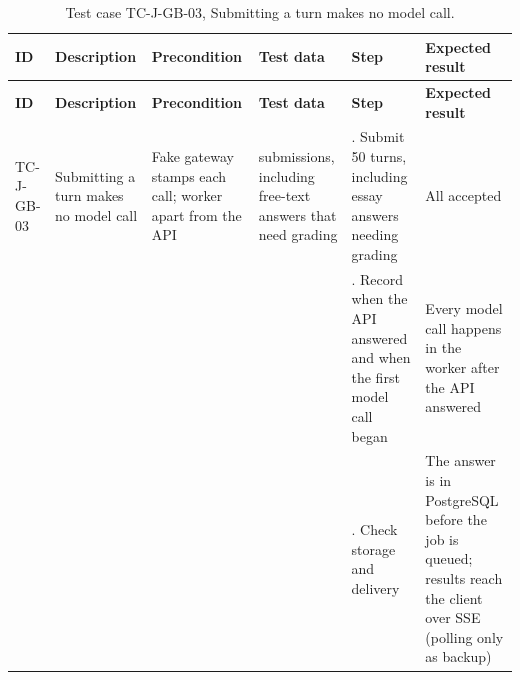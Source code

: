 {\footnotesize{}\renewcommand{\arraystretch}{1.1}
\begin{longtable}{|>{\raggedright\arraybackslash}p{}|>{\raggedright\arraybackslash}p{}|>{\raggedright\arraybackslash}p{}|>{\raggedright\arraybackslash}p{}|>{\raggedright\arraybackslash}p{}|>{\raggedright\arraybackslash}p{}|}
\caption{Test case TC-J-GB-03, Submitting a turn makes no model call.} \\
\hline
\textbf{ID} & \textbf{Description} & \textbf{Precondition} & \textbf{Test data} & \textbf{Step} & \textbf{Expected result} \\ \hline
\endfirsthead
\hline
\textbf{ID} & \textbf{Description} & \textbf{Precondition} & \textbf{Test data} & \textbf{Step} & \textbf{Expected result} \\ \hline
\endhead
TC-J-GB-03 & Submitting a turn makes no model call & Fake gateway stamps each call; worker apart from the API & 50 submissions, including free-text answers that need grading & 1. Submit 50 turns, including essay answers needing grading & All accepted \\ \cline{5-6}
 &  &  &  & 2. Record when the API answered and when the first model call began & Every model call happens in the worker after the API answered \\ \cline{5-6}
 &  &  &  & 3. Check storage and delivery & The answer is in PostgreSQL before the job is queued; results reach the client over SSE (polling only as backup) \\ \hline
\end{longtable}
}

